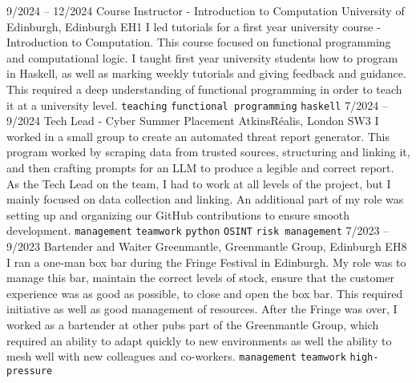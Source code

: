 \documentclass[9pt]{developercv} %
\begin{document}
\vspace{-10 pt}
\begin{entrylist}
	\entry
	{9/2024 --  12/2024}
	{Course Instructor - Introduction to Computation}
	{University of Edinburgh, Edinburgh EH1}
	{
		I led tutorials for a first year university course - Introduction to Computation.
		This course focused on functional programming and computational logic.
		I taught first year university students how to program in Haskell, as well as marking weekly tutorials and giving feedback and guidance.
		This required a deep understanding of functional programming in order to teach it at a university level.
		\newline
		\texttt{teaching} \slashsep \texttt{functional programming} \slashsep \texttt{haskell}
	}
	\entry
	{7/2024 --  9/2024}
	{Tech Lead - Cyber Summer Placement}
	{AtkinsRéalis, London SW3}
	{
		I worked in a small group to create an automated threat report generator.
		This program worked by scraping data from trusted sources, structuring and linking it, and then crafting prompts for an LLM to produce a legible and correct report.
		As the Tech Lead on the team, I had to work at all levels of the project, but I mainly focused on data collection and linking.
		An additional part of my role was setting up and organizing our GitHub contributions to ensure smooth development.
		\newline
		\texttt{management} \slashsep \texttt{teamwork} \slashsep \texttt{python} \slashsep \texttt{OSINT} \slashsep \texttt{risk management}
	}
	\entry
        {7/2023 --  9/2023}
		{Bartender and Waiter}
		{Greenmantle, Greenmantle Group, Edinburgh EH8}
		{
			I ran a one-man box bar during the Fringe Festival in Edinburgh. 
			My role was to manage this bar, maintain the correct levels of stock, ensure that the customer experience was as good as possible, to close and open the box bar.
			This required initiative as well as good management of resources.
			After the Fringe was over, I worked as a bartender at other pubs part of the Greenmantle Group, which required an ability to adapt quickly to new environments as well the ability to mesh well with new colleagues and co-workers.
        	\newline
			\texttt{management} \slashsep \texttt{teamwork} \slashsep \texttt{high-pressure}
		}
\end{entrylist}
\end{document}
